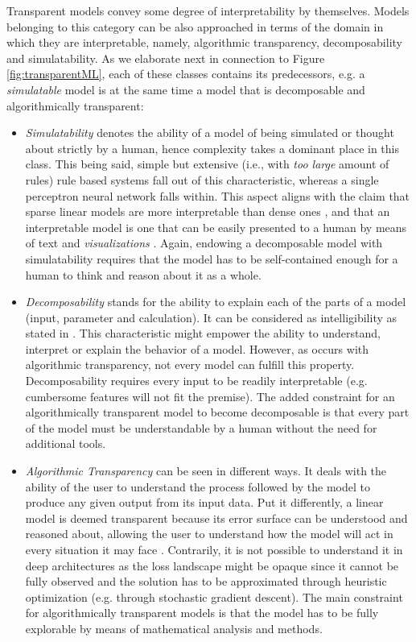 \documentclass[final]{elsarticle}
\begin{document}
Transparent models convey some degree of interpretability by themselves. Models belonging to this category can be also approached in terms of the domain in which they are interpretable, namely, algorithmic transparency, decomposability and simulatability. As we elaborate next in connection to Figure \ref{fig:transparentML}, each of these classes contains its predecessors, e.g. a  \textit{simulatable} model is at the same time a model that is decomposable and algorithmically transparent:
\begin{itemize}[leftmargin=*]
\item \textit{Simulatability} denotes the ability of a model of being simulated or thought about strictly by a human, hence complexity takes a dominant place in this class. This being said, simple but extensive (i.e., with \textit{too large} amount of rules) rule based systems fall out of this characteristic, whereas a single perceptron neural network falls within. This aspect aligns with the claim that sparse linear models are more interpretable than dense ones \cite{tibshirani1996Simulatability}, and that an interpretable model is one that can be easily presented to a human by means of text and \textit{visualizations} \cite{ribeiro2016trust}. Again, endowing a decomposable model with simulatability requires that the model has to be self-contained enough for a human to think and reason about it as a whole.

\item \textit{Decomposability} stands for the ability to explain each of the parts of a model (input, parameter and calculation). It can be considered as intelligibility as stated in \cite{lou2012Decomposability}. This characteristic might empower the ability to understand, interpret or explain the behavior of a model. However, as occurs with algorithmic transparency, not every model can fulfill this property. Decomposability requires every input to be readily interpretable (e.g. cumbersome features will not fit the premise). The added constraint for an algorithmically transparent model to become decomposable is that every part of the model must be understandable by a human without the need for additional tools.

\item \textit{Algorithmic Transparency} can be seen in different ways. It deals with the ability of the user to understand the process followed by the model to produce any given output from its input data. Put it differently, a linear model is deemed transparent because its error surface can be understood and reasoned about, allowing the user to understand how the model will act in every situation it may face \cite{james2013Transferability}. Contrarily, it is not possible to understand it in deep architectures as the loss landscape might be opaque \cite{kawaguchi2016Transparency,AlgorithmicTransparency} since it cannot be fully observed and the solution has to be approximated through heuristic optimization (e.g. through stochastic gradient descent). The main constraint for algorithmically transparent models is that the model has to be fully explorable by means of mathematical analysis and methods.
\end{itemize}
\end{document}
